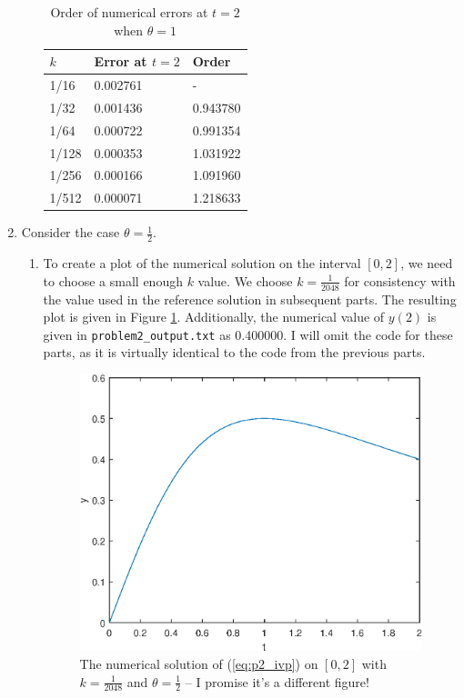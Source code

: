 \documentclass{homework}
\begin{document}
\begin{enumerate}
\begin{enumerate}[label={(\alph*)}]
			\begin{table}[h]
				\centering
				\begin{tabular}{@{}lll@{}}
					\toprule
					$k$ & Error at $t=2$ & Order\\
					\midrule
					1/16 & 0.002761 & - \\
					1/32 & 0.001436 & 0.943780 \\
					1/64 & 0.000722 & 0.991354 \\
					1/128 & 0.000353 & 1.031922 \\
					1/256 & 0.000166 & 1.091960 \\
					1/512 & 0.000071 & 1.218633 \\
					\bottomrule
				\end{tabular}
				\caption{Order of numerical errors at $t=2$ when $\theta = 1$}
				\label{tab:p2:1:c}
			\end{table}
		\end{enumerate}
		
		\item Consider the case $\theta = \frac{1}{2}$.
		\begin{enumerate}[label={(\alph*)}]
			\item To create a plot of the numerical solution on the interval $[0,2]$, we need to choose a small enough $k$ value. We choose $k = \frac{1}{2048}$ for consistency with the value used in the reference solution in subsequent parts. The resulting plot is given in Figure \ref{fig:p2_part2}. Additionally, the numerical value of $y(2)$ is given in \lstinline{problem2_output.txt} as 0.400000. I will omit the code for these parts, as it is virtually identical to the code from the previous parts.
			
			\begin{figure}[h]
				\centering
				\includegraphics{p2_2_plot.eps}
				\caption{The numerical solution of (\ref{eq:p2_ivp}) on $[0,2]$ with $k = \frac{1}{2048}$ and $\theta = \frac{1}{2}$ -- I promise it's a different figure!}
				\label{fig:p2_part2}
			\end{figure}
			

\end{enumerate}
\end{enumerate}
\end{document}
